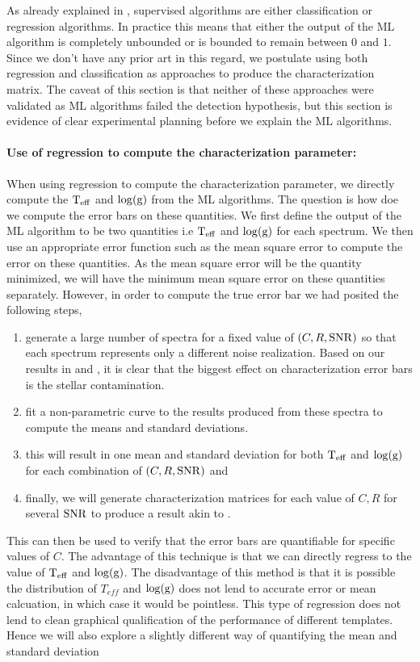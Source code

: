As already explained in , supervised algorithms are either classification or regression algorithms. 
In practice this means that either the output of the ML algorithm is completely unbounded or is bounded to remain between $0$ and $1$.
Since we don't have any prior art in this regard, we postulate using both regression and classification as approaches to produce the characterization matrix.
The caveat of this section is that neither of these approaches were validated as ML algorithms failed the detection hypothesis, but this section is evidence of clear experimental planning before we explain the ML algorithms.
\paragraph{Use of regression to compute the characterization parameter:\\}
When using regression to compute the characterization parameter, we directly compute the $\rm{T_{eff}}$ and $\rm{\log(g)}$ from the ML algorithms.
The question is how doe we compute the error bars on these quantities.
We first define the output of the ML algorithm to be two quantities i.e $\rm{T_{eff}}$ and $\rm{\log(g)}$ for each spectrum.
We then use an appropriate error function such as the mean square error to compute the error on these quantities.
As the mean square error will be the quantity minimized, we will have the minimum mean square error on these quantities separately.
However, in order to compute the true error bar we had posited the following steps,
\begin{enumerate}
    \item generate a large number of spectra for a fixed value of $\left(C,R, \rm{SNR}\right)$ so that each spectrum represents only a different noise realization. Based on our results in  and , it is clear that the biggest effect on characterization error bars is the stellar contamination. 
    \item fit a non-parametric curve to the results produced from these spectra to compute the means and standard deviations.
    \item this will result in one mean and standard deviation for both $\rm{T_{eff}}$ and $\rm{\log(g)}$ for each combination of $(C,R,\rm{SNR})$ and
    \item finally, we will generate characterization matrices for each value of $C,R$ for several $\rm{SNR}$ to produce a result akin to .
\end{enumerate}
This can then be used to verify that the error bars are quantifiable for specific values of $C$.
The advantage of this technique is that we can directly regress to the value of $\rm{T_{eff}}$ and $\rm{\log(g)}$.
The disadvantage of this method is that it is possible the distribution of $T_{eff}$ and $\rm{\log(g)}$ does not lend to accurate error or mean calcuation, in which case it would be pointless. 
This type of regression does not lend to clean graphical qualification of the performance of different templates.
Hence we will also explore a slightly different way of quantifying the mean and standard deviation
